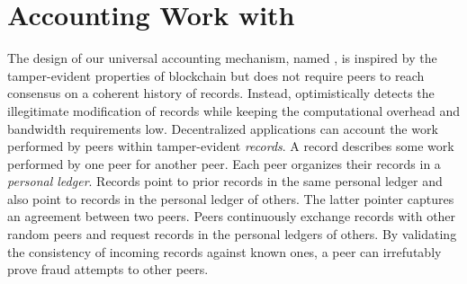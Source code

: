 
\section{Accounting Work with \ModelName{}}
\label{sec:micro_accounting}
The design of our universal accounting mechanism, named \emph{\ModelName{}}, is inspired by the tamper-evident properties of blockchain but does not require peers to reach consensus on a coherent history of records.
Instead, \ModelName{} optimistically detects the illegitimate modification of records while keeping the computational overhead and bandwidth requirements low.
Decentralized applications can account the work performed by peers within tamper-evident \emph{records}.
A record describes some work performed by one peer for another peer.
Each peer organizes their records in a \emph{personal ledger}.
Records point to prior records in the same personal ledger and also point to records in the personal ledger of others.
The latter pointer captures an agreement between two peers.
Peers continuously exchange records with other random peers and request records in the personal ledgers of others.
By validating the consistency of incoming records against known ones, a peer can irrefutably prove fraud attempts to other peers.

